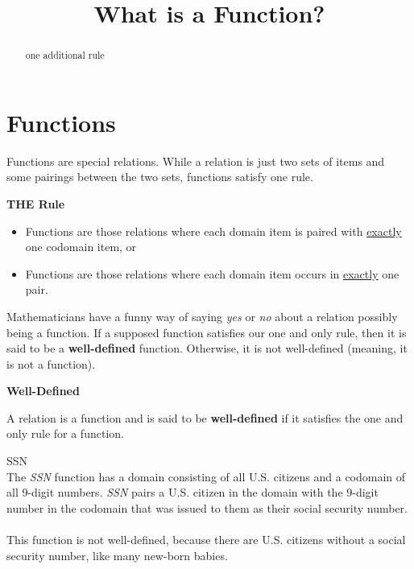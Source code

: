 \documentclass{ximera}
\title{What is a Function?}
\begin{document}
\begin{abstract}
one additional rule
\end{abstract}
\maketitle




\section{Functions}

Functions are special relations. While a relation is just two sets of items and some pairings between the two sets, functions satisfy one rule. 


\begin{condition} \textbf{\textcolor{purple!85!blue}{THE Rule}} 

\begin{itemize}
\item Functions are those relations where each domain item is paired with \underline{exactly} one codomain item, or
\item Functions are those relations where each domain item occurs in \underline{exactly} one pair.
\end{itemize}
\end{condition}





Mathematicians have a funny way of saying \textit{yes} or \textit{no} about a relation possibly being a function. If a supposed function satisfies our one and only rule, then it is said to be a \textbf{well-defined} function.  Otherwise, it is not well-defined (meaning, it is not a function).




\begin{definition} \textbf{\textcolor{green!50!black}{Well-Defined}}

A relation is a function and is said to be \textbf{well-defined} if it satisfies the one and only rule for a function.
\end{definition}





\begin{example} SSN \\
The \textit{SSN} function has a domain consisting of all U.S. citizens and a codomain of all 9-digit numbers.  \textit{SSN} pairs a U.S. citizen in the domain with the 9-digit number in the codomain that was issued to them as their social security number. 
\\ \\ 
This function is not well-defined, because there are U.S. citizens without a social security number, like many new-born babies.
\end{example}
\end{document}

